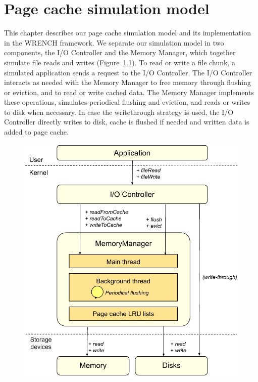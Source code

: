\chapter{Page cache simulation model}
\label{method}

This chapter describes our page cache simulation model and its implementation 
in the WRENCH framework. 
We separate our simulation model in two components, the I/O
Controller and the Memory Manager, which together simulate
file reads and writes (Figure~\ref{fig:interaction}).
To read or write a file chunk, a simulated application sends a
request to the I/O Controller. The I/O Controller interacts as needed with
the Memory Manager to free memory through flushing or eviction,
and to read or write cached data. The Memory Manager
implements these operations, simulates periodical flushing
and eviction, and reads or writes to disk when necessary.
In case the writethrough strategy is used, the I/O Controller directly writes to disk, 
cache is flushed if needed and written data is added to page cache.

\begin{figure}
       \centering
       \includegraphics[width=0.7\columnwidth]{figures/interaction.pdf}
       \label{fig:interaction}
\end{figure}





